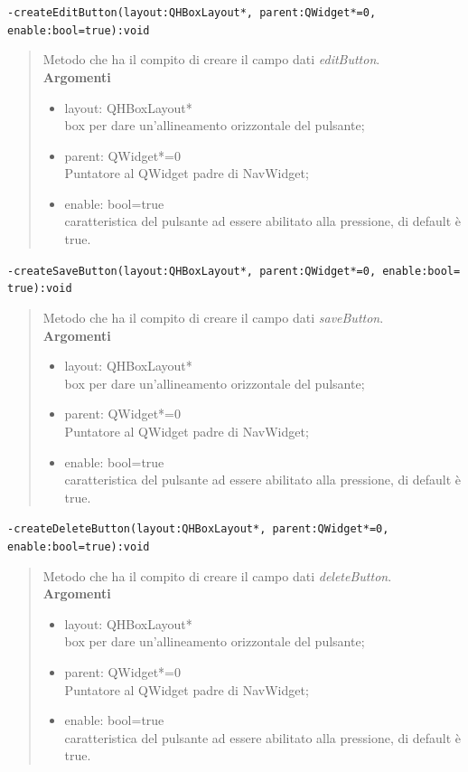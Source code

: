 \color{blue}\verb!-createEditButton(layout:QHBoxLayout*, parent:QWidget*=0, enable:bool=true):void!
\color{black}
\begin{quote}Metodo che ha il compito di creare il campo dati \emph{editButton}.\\
\textbf{Argomenti}
\begin{itemize}
\item layout: QHBoxLayout* \\ box per dare un'allineamento orizzontale del pulsante;
\item parent: QWidget*=0  \\ Puntatore al QWidget padre di NavWidget;
\item enable: bool=true \\ caratteristica del pulsante ad essere abilitato alla pressione, di default è true.
\end{itemize}
\end{quote}
\color{blue}\verb!-createSaveButton(layout:QHBoxLayout*, parent:QWidget*=0, enable:bool= true):void!
\color{black}
\begin{quote}Metodo che ha il compito di creare il campo dati \emph{saveButton}.\\
\textbf{Argomenti}
\begin{itemize}
\item layout: QHBoxLayout* \\ box per dare un'allineamento orizzontale del pulsante;
\item parent: QWidget*=0  \\ Puntatore al QWidget padre di NavWidget;
\item enable: bool=true \\ caratteristica del pulsante ad essere abilitato alla pressione, di default è true.
\end{itemize}
\end{quote} 
\color{blue}\verb!-createDeleteButton(layout:QHBoxLayout*, parent:QWidget*=0, enable:bool=true):void!
\color{black}
\begin{quote}Metodo che ha il compito di creare il campo dati \emph{deleteButton}.\\
\textbf{Argomenti}
\begin{itemize}
\item layout: QHBoxLayout* \\ box per dare un'allineamento orizzontale del pulsante;
\item parent: QWidget*=0  \\ Puntatore al QWidget padre di NavWidget;
\item enable: bool=true \\ caratteristica del pulsante ad essere abilitato alla pressione, di default è true.
\end{itemize}
\end{quote}

